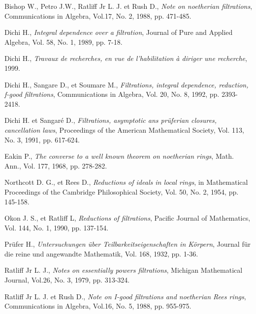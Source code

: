 \begin{thebibliography}{99}
	
	
	 Bishop W., Petro J.W., Ratliff Jr L. J. et Rush D.,\textit{ Note on noetherian filtrations}, Communications in Algebra, Vol.17, No. 2, 1988, pp. 471-485.
	
	 Dichi H.,\textit{ Integral dependence over a filtration}, Journal of Pure and Applied Algebra, Vol. 58, No. 1, 1989, pp. 7-18. 
	
	 Dichi H., \textit{Travaux de recherches, en vue de l'habilitation à diriger une recherche}, 1999.
	
	 Dichi H., Sangare D., et Soumare M.,\textit{ Filtrations, integral dependence, reduction, f-good filtrations}, Communications in Algebra, Vol. 20, No. 8, 1992, pp. 2393-2418.
	
	 Dichi H. et Sangaré D.,\textit{ Filtrations, asymptotic ans prüferian closures, cancellation laws}, Proceedings of the American Mathematical Society, Vol. 113, No. 3, 1991, pp. 617-624. 
	
	 Eakin P., \textit{The converse to a well known theorem on noetherian rings}, Math. Ann., Vol. 177, 1968, pp. 278-282.
	
	 Northcott D. G., et Rees D.,\textit{ Reductions of ideals in local rings}, in Mathematical Proceedings of the Cambridge Philosophical Society, Vol. 50, No. 2, 1954, pp. 145-158.
	
	 Okon J. S., et Ratliff L,\textit{ Reductions of filtrations}, Pacific Journal of Mathematics, Vol. 144, No. 1, 1990, pp. 137-154.
	
	 Prüfer H.,\textit{ Untersuchungen über Teilbarkeitseigenschaften in Körpern}, Journal für die reine und angewandte Mathematik, Vol. 168, 1932, pp. 1-36.
	
	 Ratliff Jr L. J.,\textit{ Notes on essentially powers filtrations}, Michigan Mathematical Journal, Vol.26, No. 3, 1979, pp. 313-324.
	
	 Ratliff Jr L. J. et Rush D.,\textit{ Note on I-good filtrations and noetherian Rees rings}, Communications in Algebra, Vol.16, No. 5, 1988, pp. 955-975.

\end{thebibliography}
